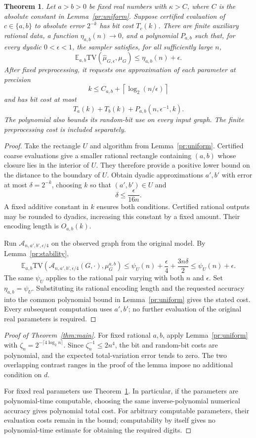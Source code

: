 \documentclass[11pt]{article}
\newcommand{\TV}{\mathrm{TV}}
\def\E{\mathbb{E}}
\newtheorem{thm}{Theorem}[section]
\numberwithin{equation}{section}
\begin{document}
\begin{thm}\label{pr:real}
Let $a>b>0$ be fixed real numbers with $\kappa>C$, where $C$ is the absolute constant in Lemma~\ref{pr:uniform}. Suppose certified evaluation of $c\in\{a,b\}$ to absolute error $2^{-k}$ has bit cost $T_c(k)$. There are finite auxiliary rational data, a function $\eta_{a,b}(n)\to0$, and a polynomial $P_{a,b}$ such that, for every dyadic $0<\epsilon<1$, the sampler satisfies, for all sufficiently large $n$,
\[
 \E_{a,b}\TV(\widehat\mu_{G,\epsilon},\mu_G)\le\eta_{a,b}(n)+\epsilon.
\]
After fixed preprocessing, it requests one approximation of each parameter at precision
\[
 k\le C_{a,b}+\left\lceil\log_2(n/\epsilon)\right\rceil
\]
and has bit cost at most
\[
 T_a(k)+T_b(k)+P_{a,b}(n,\epsilon^{-1},k).
\]
The polynomial also bounds its random-bit use on every input graph. The finite preprocessing cost is included separately.
\end{thm}

\begin{proof}
Take the rectangle $U$ and algorithm from Lemma~\ref{pr:uniform}. Certified coarse evaluations give a smaller rational rectangle containing $(a,b)$ whose closure lies in the interior of $U$. They therefore provide a positive lower bound on the distance to the boundary of $U$. Obtain dyadic approximations $a',b'$ with error at most $\delta=2^{-k}$, choosing $k$ so that $(a',b')\in U$ and
\[
 \delta\le\frac{\epsilon}{16n}.
\]
A fixed additive constant in $k$ ensures both conditions. Certified rational outputs may be rounded to dyadics, increasing this constant by a fixed amount. Their encoding length is $O_{a,b}(k)$.

Run $\mathcal A_{n,a',b',\epsilon/4}$ on the observed graph from the original model. By Lemma~\ref{pr:stability},
\[
 \E_{a,b}\TV(\mathcal A_{n,a',b',\epsilon/4}(G,\cdot),\mu_G^{a,b})
 \le\psi_U(n)+\frac\epsilon4+\frac{3n\delta}{2}
 \le\psi_U(n)+\epsilon.
\]
The same $\psi_U$ applies to the rational pair varying with both $n$ and $\epsilon$. Set $\eta_{a,b}=\psi_U$. Substituting its rational encoding length and the requested accuracy into the common polynomial bound in Lemma~\ref{pr:uniform} gives the stated cost. Every subsequent computation uses $a',b'$; no further evaluation of the original real parameters is required.
\end{proof}

\begin{proof}[Proof of Theorem~\ref{thm:main}]
For fixed rational $a,b$, apply Lemma~\ref{pr:uniform} with
$\zeta_n=2^{-\lceil4\log_2 n\rceil}$. Since $\zeta_n^{-1}\le2n^4$, the bit and random-bit costs are polynomial, and the expected total-variation error tends to zero. The two overlapping contrast ranges in the proof of the lemma impose no additional condition on $d$.

For fixed real parameters use Theorem~\ref{pr:real}. In particular, if the parameters are polynomial-time computable, choosing the same inverse-polynomial numerical accuracy gives polynomial total cost. For arbitrary computable parameters, their evaluation costs remain in the bound; computability by itself gives no polynomial-time estimate for obtaining the required digits.
\end{proof}
\end{document}
